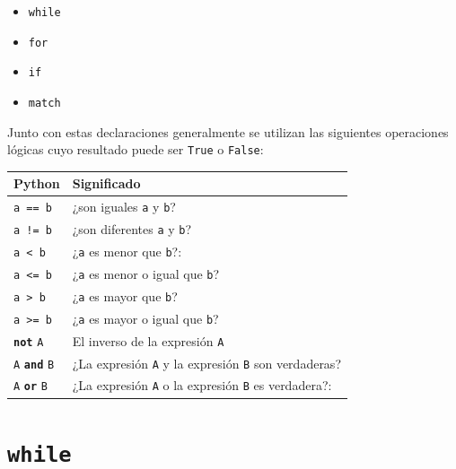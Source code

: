 \documentclass[
  spanish,
  letterpaper,
]{scrbook}
\providecommand{\tightlist}{%
  \setlength{\itemsep}{0pt}\setlength{\parskip}{0pt}}
\theoremstyle{definition}
\theoremstyle{remark}
\begin{document}
\begin{itemize}
\tightlist
\item
  \texttt{while}
\item
  \texttt{for}
\item
  \texttt{if}
\item
  \texttt{match}
\end{itemize}

Junto con estas declaraciones generalmente se utilizan las siguientes
operaciones lógicas cuyo resultado puede ser \texttt{True} o
\texttt{False}:

\begin{longtable}[]{@{}
  >{\raggedright\arraybackslash}p{}
  >{\raggedright\arraybackslash}p{}@{}}
\toprule\noalign{}
\begin{minipage}[b]{\linewidth}\raggedright
Python
\end{minipage} & \begin{minipage}[b]{\linewidth}\raggedright
Significado
\end{minipage} \\
\midrule\noalign{}
\endhead
\bottomrule\noalign{}
\endlastfoot
\texttt{a\ ==\ b} & ¿son iguales \texttt{a} y \texttt{b}? \\
\texttt{a\ !=\ b} & ¿son diferentes \texttt{a} y \texttt{b}? \\
\texttt{a\ \textless{}\ b} & ¿\texttt{a} es menor que \texttt{b}?: \\
\texttt{a\ \textless{}=\ b} & ¿\texttt{a} es menor o igual que
\texttt{b}? \\
\texttt{a\ \textgreater{}\ b} & ¿\texttt{a} es mayor que \texttt{b}? \\
\texttt{a\ \textgreater{}=\ b} & ¿\texttt{a} es mayor o igual que
\texttt{b}? \\
\textbf{\texttt{not}} \texttt{A} & El inverso de la expresión
\texttt{A} \\
\texttt{A} \textbf{\texttt{and}} \texttt{B} & ¿La expresión \texttt{A} y
la expresión \texttt{B} son verdaderas? \\
\texttt{A} \textbf{\texttt{or}} \texttt{B} & ¿La expresión \texttt{A} o
la expresión \texttt{B} es verdadera?: \\
\end{longtable}

\section{\texorpdfstring{\texttt{while}}{while}}\label{while}
\end{document}
